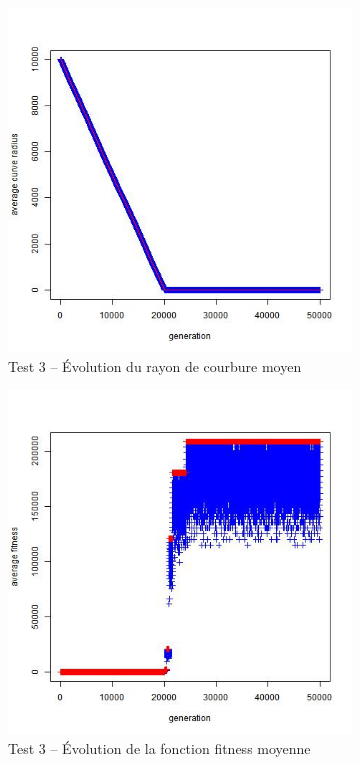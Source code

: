 \documentclass[a4paper,11pt]{article}
\begin{document}
\begin{figure}
\centering
\begin{subfigure}{.5\textwidth}
  \centering
\includegraphics[width=1\linewidth]{1487424573992_evolution_average_curve_radius.jpeg}
\caption{Test 3 – Évolution du rayon de courbure moyen}
\label{fig:sub31}
\end{subfigure}%
\begin{subfigure}{.5\textwidth}
  \centering
\includegraphics[width=1\linewidth]{1487424573992_evolution_average_fitness.jpeg}
\caption{Test 3 – Évolution de la fonction fitness moyenne}
\label{fig:sub32}
\end{subfigure}
\caption{}
\label{fig:test}
\end{figure}
\end{document}

